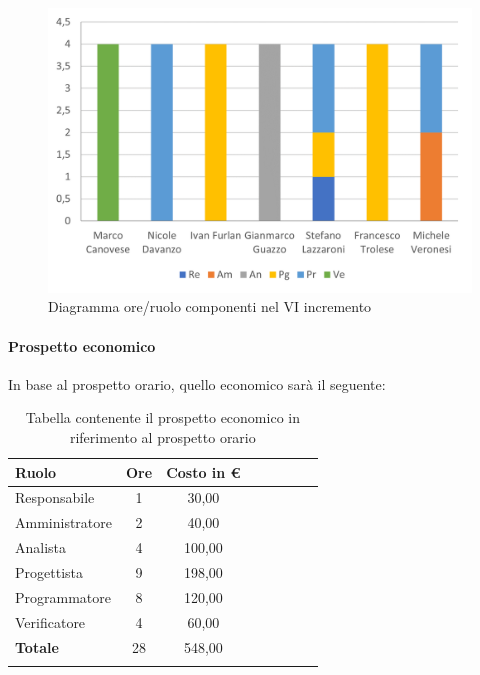 \begin{figure}[H]
	\centering
	\includegraphics[width=0.8\linewidth]{res/images/preventivo/dettaglio_implementazione/3-1.png}
	\caption{Diagramma ore/ruolo componenti nel VI incremento}
	\label{fig:diagramma suddivisione ruoli VI incremento}
\end{figure}

\paragraph{Prospetto economico}
In base al prospetto orario, quello economico sarà il seguente:

\begin{longtable}{|l|c|c|c|c|c|c|c|}
	\hline
	\rowcolor{lighter-grayer}
	\textbf{Ruolo}  & \textbf{Ore} & \textbf{Costo in €} \\
	\hline
	\endfirsthead

	\hline
	Responsabile    & 1            & 30,00              \\
	\hline
	\hline
	Amministratore  & 2            & 40,00               \\
	\hline
	\hline
	Analista        & 4           & 100,00              \\
	\hline
	\hline
	Progettista     & 9            & 198,00                   \\
	\hline
	\hline
	Programmatore   & 8            & 120,00                   \\
	\hline
	\hline
	Verificatore    & 4           & 60,00              \\
	\hline
	\textbf{Totale} & 28           & 548,00            \\
	\hline
	\rowcolor{white}
	\caption{Tabella contenente il prospetto economico in riferimento al prospetto orario}
\end{longtable}
\pagebreak

